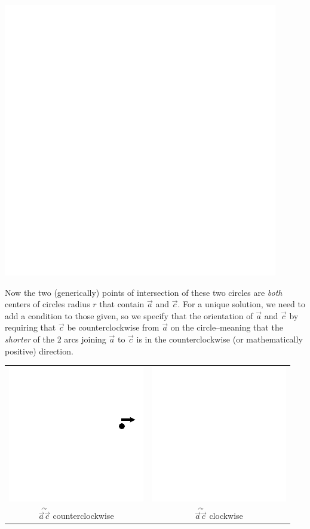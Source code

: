 \documentclass[12pt]{article}
\begin{document}
\includegraphics{FinnFigure1}

Now the two (generically) points of intersection of these two circles
are {\em both} centers of circles radius $r$ that contain
$\vec{a}$ and $\vec{c}$. For a unique solution, we
need to add a condition to those given, so we specify that the
orientation of $\vec{a}$ and $\vec{c}$ by
requiring that $\vec{c}$ be counterclockwise from
$\vec{a}$ on the circle--meaning that the {\em shorter} of
the 2 arcs joining $\vec{a}$ to $\vec{c}$ is in
the counterclockwise (or mathematically positive) direction.

\begin{tabular}[c]{cc}
\includegraphics{FinnFigure2a} & \includegraphics{FinnFigure2b} \\
$\overset{\curvearrowright}{\vec{a}\vec{c}}$ counterclockwise &
$\overset{\curvearrowright}{\vec{a}\vec{c}}$ clockwise \\
\end{tabular}
\end{document}
